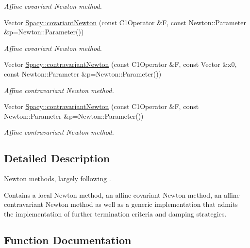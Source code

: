 \begin{DoxyCompactItemize}
\begin{DoxyCompactList}\small\item\em Affine covariant Newton method. \end{DoxyCompactList}\item 
Vector \hyperlink{group__NewtonGroup_gaf1a54d96b031527304e8d7e421005a07_gaf1a54d96b031527304e8d7e421005a07}{Spacy\+::covariant\+Newton} (const C1\+Operator \&F, const Newton\+::\+Parameter \&p=Newton\+::\+Parameter())
\begin{DoxyCompactList}\small\item\em Affine covariant Newton method. \end{DoxyCompactList}\item 
Vector \hyperlink{group__NewtonGroup_gaa32f667c573986b2b2721ec6532fc832_gaa32f667c573986b2b2721ec6532fc832}{Spacy\+::contravariant\+Newton} (const C1\+Operator \&F, const Vector \&x0, const Newton\+::\+Parameter \&p=Newton\+::\+Parameter())
\begin{DoxyCompactList}\small\item\em Affine contravariant Newton method. \end{DoxyCompactList}\item 
Vector \hyperlink{group__NewtonGroup_gace045630c7f0c7a1a5a48d2d0807f608_gace045630c7f0c7a1a5a48d2d0807f608}{Spacy\+::contravariant\+Newton} (const C1\+Operator \&F, const Newton\+::\+Parameter \&p=Newton\+::\+Parameter())
\begin{DoxyCompactList}\small\item\em Affine contravariant Newton method. \end{DoxyCompactList}\end{DoxyCompactItemize}


\subsection{Detailed Description}
Newton methods, largely following \cite{Deuflhard2004}. 

Contains a local Newton method, an affine covariant Newton method, an affine contravariant Newton method as well as a generic implementation that admits the implementation of further termination criteria and damping strategies. 

\subsection{Function Documentation}
\hypertarget{group__NewtonGroup_gaa32f667c573986b2b2721ec6532fc832_gaa32f667c573986b2b2721ec6532fc832}{}
